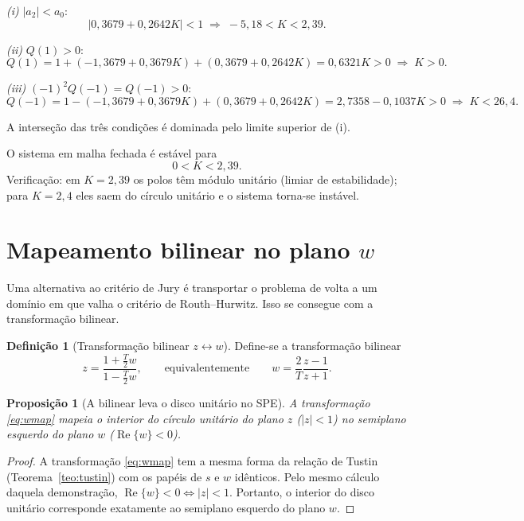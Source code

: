 \documentclass[11pt,a4paper,oneside]{book}
\theoremstyle{definition}
\newtheorem{definicao}{Definição}[chapter]
\theoremstyle{plain}
\newtheorem{proposicao}{Proposição}[chapter]
\newcommand{\Real}{\operatorname{Re}}
\begin{document}
\emph{(i)} $|a_2|<a_0$:
\[
|0{,}3679+0{,}2642K|<1
\;\Longrightarrow\;
-5{,}18<K<2{,}39.
\]

\emph{(ii)} $Q(1)>0$:
\[
Q(1)=1+(-1{,}3679+0{,}3679K)+(0{,}3679+0{,}2642K)=0{,}6321K>0
\;\Longrightarrow\; K>0.
\]

\emph{(iii)} $(-1)^2Q(-1)=Q(-1)>0$:
\[
Q(-1)=1-(-1{,}3679+0{,}3679K)+(0{,}3679+0{,}2642K)=2{,}7358-0{,}1037K>0
\;\Longrightarrow\; K<26{,}4.
\]

A interseção das três condições é dominada pelo limite superior de (i).

\begin{destaque}
O sistema em malha fechada é estável para
\[
0<K<2{,}39.
\]
Verificação: em $K=2{,}39$ os polos têm módulo unitário (limiar de
estabilidade); para $K=2{,}4$ eles saem do círculo unitário e o sistema torna-se
instável.
\end{destaque}

\section{Mapeamento bilinear no plano \texorpdfstring{$w$}{w}}
\label{sec:wplane}

Uma alternativa ao critério de Jury é transportar o problema de volta a um
domínio em que valha o critério de Routh--Hurwitz. Isso se consegue com a
transformação bilinear.

\begin{definicao}[Transformação bilinear $z\leftrightarrow w$]
Define-se a transformação bilinear
\begin{equation}
    z=\frac{1+\frac{T}{2}w}{1-\frac{T}{2}w},
    \qquad\text{equivalentemente}\qquad
    w=\frac{2}{T}\frac{z-1}{z+1}.
    \label{eq:wmap}
\end{equation}
\end{definicao}

\begin{proposicao}[A bilinear leva o disco unitário no SPE]
\label{prop:w}
A transformação \eqref{eq:wmap} mapeia o interior do círculo unitário do plano
$z$ ($|z|<1$) no semiplano esquerdo do plano $w$ ($\Real\{w\}<0$).
\end{proposicao}

\begin{proof}
A transformação \eqref{eq:wmap} tem a mesma forma da relação de Tustin
(Teorema~\ref{teo:tustin}) com os papéis de $s$ e $w$ idênticos. Pelo mesmo
cálculo daquela demonstração, $\Real\{w\}<0\iff|z|<1$. Portanto, o interior do
disco unitário corresponde exatamente ao semiplano esquerdo do plano $w$.
\end{proof}
\end{document}
